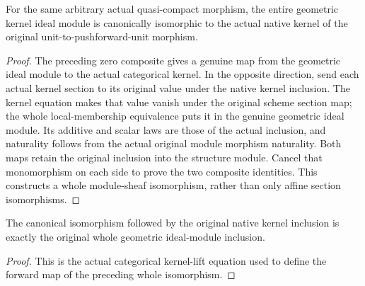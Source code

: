 \begin{theorem}
\label{alggeom:actual-morphism-geometric-native-kernel-iso}
\leanok
{}
For the same arbitrary actual quasi-compact morphism, the entire geometric
kernel ideal module is canonically isomorphic to the actual native kernel of
the original unit-to-pushforward-unit morphism.
\end{theorem}
\begin{proof}
The preceding zero composite gives a genuine map from the geometric ideal
module to the actual categorical kernel. In the opposite direction, send each
actual kernel section to its original value under the native kernel inclusion.
The kernel equation makes that value vanish under the original scheme section
map; the whole local-membership equivalence puts it in the genuine geometric
ideal module. Its additive and scalar laws are those of the actual inclusion,
and naturality follows from the actual original module morphism naturality.
Both maps retain the original inclusion into the structure module. Cancel that
monomorphism on each side to prove the two composite identities. This constructs
a whole module-sheaf isomorphism, rather than only affine section isomorphisms.
\end{proof}

\begin{lemma}
\label{alggeom:actual-morphism-kernel-iso-inclusion}
\leanok
{}
The canonical isomorphism followed by the original native kernel inclusion
is exactly the original whole geometric ideal-module inclusion.
\end{lemma}
\begin{proof}
This is the actual categorical kernel-lift equation used to define the forward
map of the preceding whole isomorphism.
\end{proof}
